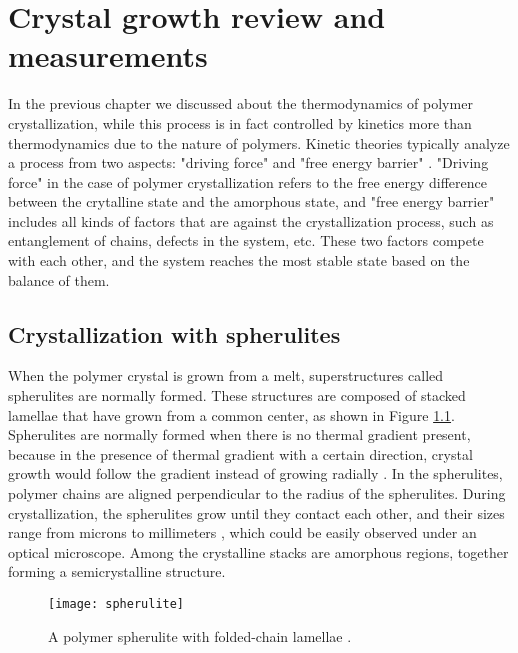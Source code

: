 \chapter{Crystal growth review and measurements}\label{chap_growth}
\graphicspath{{./growth/graphs/}}

In the previous chapter we discussed about the thermodynamics of polymer crystallization, while this process is in fact controlled by kinetics more than thermodynamics due to the nature of polymers. Kinetic theories typically analyze a process from two aspects: "driving force" and "free energy barrier" \cite{Zhang2016a}. "Driving force" in the case of polymer crystallization refers to the free energy difference between the crytalline state and the amorphous state, and "free energy barrier" includes all kinds of factors that are against the crystallization process, such as entanglement of chains, defects in the system, etc. These two factors compete with each other, and the system reaches the most stable state based on the balance of them.

\section{Crystallization with spherulites}

When the polymer crystal is grown from a melt, superstructures called spherulites are normally formed. These structures are composed of stacked lamellae that have grown from a common center, as shown in Figure \ref{fig:spherulite}. Spherulites are normally formed when there is no thermal gradient present, because in the presence of thermal gradient with a certain direction, crystal growth would follow the gradient instead of growing radially \cite{Carraher2003}. In the spherulites, polymer chains are aligned perpendicular to the radius of the spherulites. During crystallization, the spherulites grow until they contact each other, and their sizes range from microns to millimeters \cite{Vasile2000}, which could be easily observed under an optical microscope. Among the crystalline stacks are amorphous regions, together forming a semicrystalline structure.

\begin{figure}[H]
\center
\vspace{1 cm}
\texttt{[image: spherulite]}
\caption[A polymer spherulite with folded-chain lamellae.]{A polymer spherulite with folded-chain lamellae \cite{High}.}
\label{fig:spherulite}
\end{figure}

